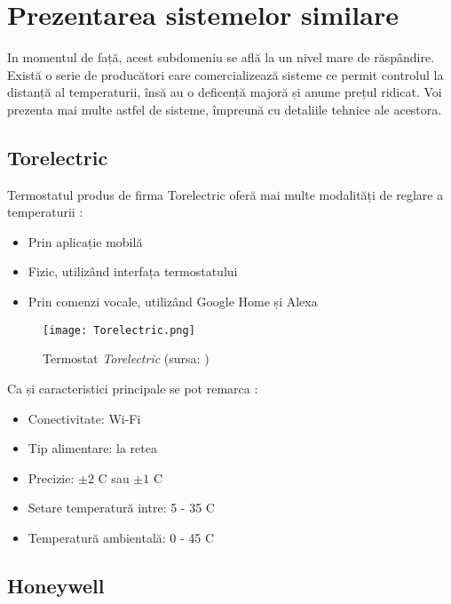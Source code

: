 \chapter{Prezentarea sistemelor similare}\label{ch:2sistemeSimilare}

	In momentul de față, acest subdomeniu se află la un nivel mare de răspândire. Există o serie de producători care comercializează sisteme ce permit controlul la distanță al temperaturii, însă au o deficență majoră și anume prețul ridicat. Voi prezenta mai multe astfel de sisteme, împreună cu detaliile tehnice ale acestora. 	

\section{Torelectric}
	Termostatul produs de firma Torelectric oferă mai multe modalități de reglare a temperaturii \cite{torelectric}:
	\begin{itemize}
  	\setlength{\itemindent}{2em}
		\itemsep0em
		\item Prin aplicație mobilă
		\item Fizic, utilizând interfața termostatului
		\item Prin comenzi vocale, utilizând Google Home și Alexa
	\end{itemize}
	

	\begin{figure}[H]
    		\centering
    		\texttt{[image: Torelectric.png]}
		\caption{Termostat \textit{Torelectric} (sursa: \cite{torelectric})}
	\end{figure}

	Ca și caracteristici principale se pot remarca \cite{torelectric}:
	\begin{itemize}
	\setlength{\itemindent}{2em}
		\itemsep0em
		\item Conectivitate: Wi-Fi
		\item Tip alimentare: la retea
		\item Precizie: $\pm 2$ \textdegree{}C sau $\pm 1$ \textdegree{}C
		\item Setare temperatură intre: 5 - 35 \textdegree{}C
		\item Temperatură ambientală: 0 - 45 \textdegree{}C
	\end{itemize}

\section{Honeywell}

